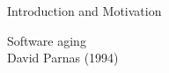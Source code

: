 \documentclass[newPxFont,numfooter,sectionpages]{beamer}
\begin{document}
{
%
\begin{frame}[c]{Introduction and Motivation}

\centering
Software aging \\
{\centering David Parnas (1994)}




\end{frame}
}

\end{document}
